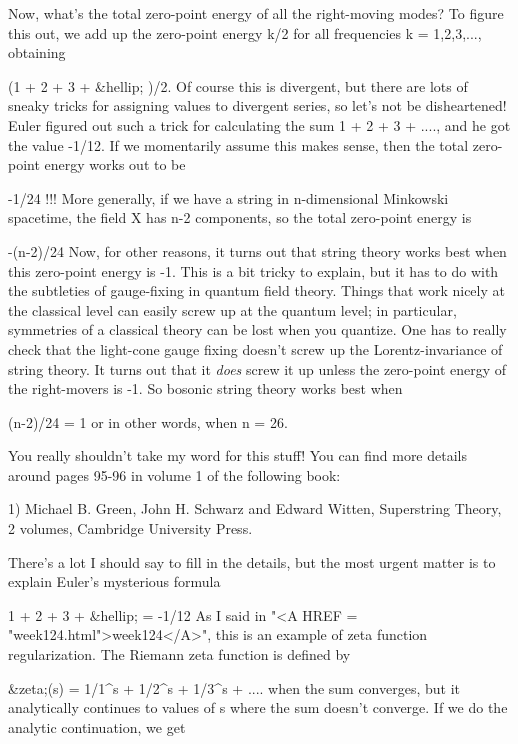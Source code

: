 Now, what's the total zero-point energy of all the right-moving modes?
To figure this out, we add up the zero-point energy k/2 for all
frequencies k = 1,2,3,..., obtaining

                     (1 + 2 + 3 + &hellip; )/2.
Of course this is divergent, but there are lots of sneaky tricks for
assigning values to divergent series, so let's not be disheartened!  
Euler figured out such a trick for calculating the sum 1 + 2 + 3 + ....,
and he got the value -1/12.  If we momentarily assume this makes sense,
then the total zero-point energy works out to be

                            -1/24 !!!
More generally, if we have a string in n-dimensional Minkowski spacetime,
the field X has n-2 components, so the total zero-point energy is

                           -(n-2)/24
Now, for other reasons, it turns out that string theory works best when
this zero-point energy is -1.  This is a bit tricky to explain, but it
has to do with the subtleties of gauge-fixing in quantum field theory.
Things that work nicely at the classical level can easily screw up at
the quantum level; in particular, symmetries of a classical theory can
be lost when you quantize.  One has to really check that the light-cone
gauge fixing doesn't screw up the Lorentz-invariance of string theory. 
It turns out that it \emph{does} screw it up unless the zero-point energy of
the right-movers is -1.  So bosonic string theory works best when

                          (n-2)/24 = 1
or in other words, when n = 26.

You really shouldn't take my word for this stuff!  You can find more 
details around pages 95-96 in volume 1 of the following book:

1) Michael B. Green, John H. Schwarz and Edward Witten, Superstring Theory,
2 volumes, Cambridge University Press.

There's a lot I should say to fill in the details, but the most urgent 
matter is to explain Euler's mysterious formula

                      1 + 2 + 3 + &hellip; = -1/12
As I said in "<A HREF = "week124.html">week124</A>", this is an example of zeta function regularization.  
The Riemann zeta function is defined by

                      &zeta;(s) = 1/1^{s} + 1/2^{s} + 1/3^{s} + ....
when the sum converges, but it analytically continues to values of s where 
the sum doesn't converge.  If we do the analytic continuation, we get 

